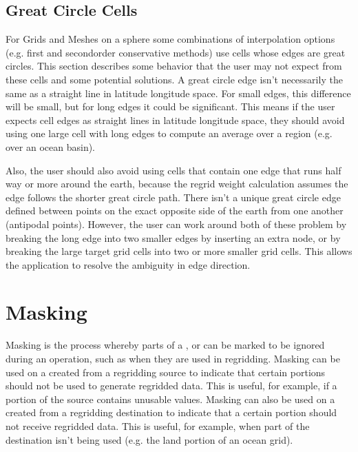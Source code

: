 \documentclass[letterpaper,10pt,english]{sphinxmanual}
\begin{document}
\subsection{Great Circle Cells}
\label{\detokenize{api:id7}}
For Grids and Meshes on a sphere some combinations of interpolation options
(e.g. first and second\sphinxhyphen{}order conservative methods) use cells whose edges are
great circles. This section describes some behavior that the user may not expect
from these cells and some potential solutions. A great circle edge isn’t
necessarily the same as a straight line in latitude longitude space. For small
edges, this difference will be small, but for long edges it could be
significant. This means if the user expects cell edges as straight lines in
latitude longitude space, they should avoid using one large cell with long edges
to compute an average over a region (e.g. over an ocean basin).

Also, the user should also avoid using cells that contain one edge that runs
half way or more around the earth, because the regrid weight calculation assumes
the edge follows the shorter great circle path. There isn’t a unique great
circle edge defined between points on the exact opposite side of the earth from
one another (antipodal points). However, the user can work around both of these
problem by breaking the long edge into two smaller edges by inserting an extra
node, or by breaking the large target grid cells into two or more smaller grid
cells. This allows the application to resolve the ambiguity in edge direction.


\section{Masking}
\label{\detokenize{api:id8}}\label{\detokenize{api:id9}}
Masking is the process whereby parts of a {\hyperref[\detokenize{grid:ESMF.api.grid.Grid}]{}}, {\hyperref[\detokenize{mesh:ESMF.api.mesh.Mesh}]{}} or {\hyperref[\detokenize{locstream:ESMF.api.locstream.LocStream}]{}} can be marked to be ignored
during an operation, such as when they are used in regridding. Masking can be used on a {\hyperref[\detokenize{field:ESMF.api.field.Field}]{}}
created from a regridding source to indicate that certain portions should not be used to generate
regridded data. This is useful, for example, if a portion of the source contains unusable values.
Masking can also be used on a {\hyperref[\detokenize{field:ESMF.api.field.Field}]{}} created from a regridding destination to indicate that a certain
portion should not receive regridded data. This is useful, for example, when part of the destination
isn’t being used (e.g. the land portion of an ocean grid).
\end{document}
